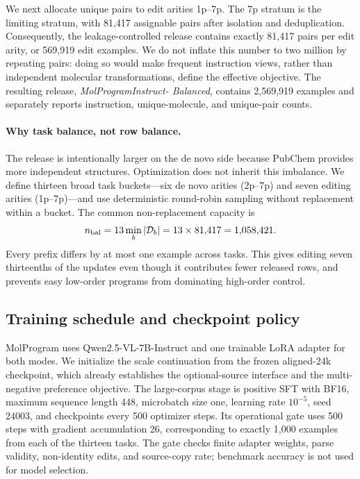 We next allocate unique pairs to edit arities 1p--7p. The 7p stratum is the
limiting stratum, with 81,417 assignable pairs after isolation and
deduplication. Consequently, the leakage-controlled release contains exactly
81,417 pairs per edit arity, or 569,919 edit examples. We do not inflate this
number to two million by repeating pairs: doing so would make frequent
instruction views, rather than independent molecular transformations, define
the effective objective. The resulting release, \emph{MolProgramInstruct-
Balanced}, contains 2,569,919 examples and separately reports instruction,
unique-molecule, and unique-pair counts.

\paragraph{Why task balance, not row balance.}
The release is intentionally larger on the de novo side because PubChem
provides more independent structures. Optimization does not inherit this
imbalance. We define thirteen broad task buckets---six de novo arities (2p--7p)
and seven editing arities (1p--7p)---and use deterministic round-robin sampling
without replacement within a bucket. The common non-replacement capacity is
\begin{equation}
 n_{\rm bal}=13\min_b |\mathcal D_b|
 =13\times81{,}417=1{,}058{,}421.
 \label{eq:balanced-training-capacity}
\end{equation}
Every prefix differs by at most one example across tasks. This gives editing
seven thirteenths of the updates even though it contributes fewer released
rows, and prevents easy low-order programs from dominating high-order control.

\subsection{Training schedule and checkpoint policy}
MolProgram uses Qwen2.5-VL-7B-Instruct and one trainable LoRA adapter for both
modes. We initialize the scale continuation from the frozen aligned-24k
checkpoint, which already establishes the optional-source interface and the
multi-negative preference objective. The large-corpus stage is positive SFT
with BF16, maximum sequence length 448, microbatch size one, learning rate
$10^{-5}$, seed 24003, and checkpoints every 500 optimizer steps. Its
operational gate uses 500 steps with gradient accumulation 26, corresponding
to exactly 1,000 examples from each of the thirteen tasks. The gate checks
finite adapter weights, parse validity, non-identity edits, and source-copy
rate; benchmark accuracy is not used for model selection.

